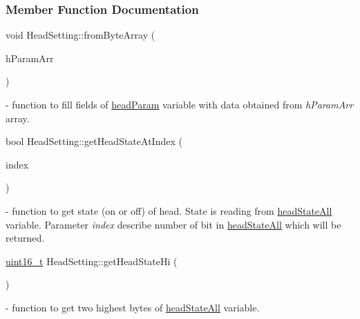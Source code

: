 \subsubsection{Member Function Documentation}
\mbox{\label{classHeadSetting_a14f70fd21c7b49f6ac0ebc71cef6583b}} 
{\footnotesize\ttfamily void Head\+Setting\+::\texorpdfstring{from\+Byte\+Array}{fromByteArray} (\begin{DoxyParamCaption}\item[{Q\+Byte\+Array}]{h\+Param\+Arr }\end{DoxyParamCaption})} - function to fill fields of \hyperlink{classHeadSetting_a842397f02022fd1d4217afb65beac990}{head\+Param} variable with data obtained from \textit{{h\+Param\+Arr }} array.

\mbox{\label{classHeadSetting_a356608c5e1fa48fdb3757b756a87de77}} 
{\footnotesize\ttfamily bool Head\+Setting\+::\texorpdfstring{get\+Head\+State\+At\+Index}{getHeadStateAtIndex} (\begin{DoxyParamCaption}\item[{\mbox{\hyperlink{settings_8h_a48091a1e52849b0871df2f7081be2e38}{uint8\+\_\+t}}}]{index }\end{DoxyParamCaption}){\ttfamily [static]}} - function to get state (on or off) of head. State is reading from \hyperlink{classHeadSetting_ab80c33d0484f96c53e92ce1842fd0b43}{head\+State\+All} variable. Parameter \textit{index} describe number of bit in \hyperlink{classHeadSetting_ab80c33d0484f96c53e92ce1842fd0b43}{head\+State\+All} which will be returned.

\mbox{\label{classHeadSetting_aa63ae6dc7f85ebb31c3245a69634857e}} 
{\footnotesize\ttfamily \mbox{\hyperlink{settings_8h_a017dd44e68049ffdd31500a8cd01ba68}{uint16\+\_\+t}} Head\+Setting\+::\texorpdfstring{get\+Head\+State\+Hi}{getHeadStateHi} (\begin{DoxyParamCaption}{ }\end{DoxyParamCaption}){\ttfamily [static]}} - function to get two highest bytes of \hyperlink{classHeadSetting_ab80c33d0484f96c53e92ce1842fd0b43}{head\+State\+All} variable.

